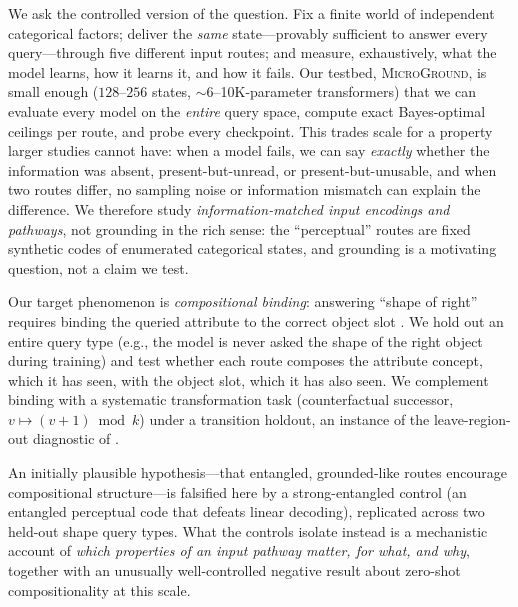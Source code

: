 \documentclass[10pt]{article} %
\newcommand{\microground}{\textsc{MicroGround}}
\begin{document}
We ask the controlled version of the question. Fix a finite world of independent categorical
factors; deliver the \emph{same} state---provably sufficient to answer every query---through five
different input routes; and measure, exhaustively, what the model learns, how it learns it, and how
it fails. Our testbed, \microground{}, is small enough ($128$--$256$ states, $\sim$6--10K-parameter
transformers) that we can evaluate every model on the \emph{entire} query space, compute exact
Bayes-optimal ceilings per route, and probe every checkpoint. This trades scale for a property
larger studies cannot have: when a model fails, we can say \emph{exactly} whether the information
was absent, present-but-unread, or present-but-unusable, and when two routes differ, no sampling
noise or information mismatch can explain the difference. We therefore study \emph{information-matched
input encodings and pathways}, not grounding in the rich sense: the ``perceptual'' routes are fixed
synthetic codes of enumerated categorical states, and grounding is a motivating question, not a
claim we test.

Our target phenomenon is \emph{compositional binding}: answering ``shape of right'' requires
binding the queried attribute to the correct object slot \citep{greff2020binding,feng2024how}. We
hold out an entire query type (e.g., the model is never asked the shape of the right object during
training) and test whether each route composes the attribute concept, which it has seen, with the
object slot, which it has also seen. We complement binding with a systematic transformation task
(counterfactual successor, $v \mapsto (v{+}1) \bmod k$) under a transition holdout, an instance of
the leave-region-out diagnostic of \citet{hu2024case}.

An initially plausible hypothesis---that entangled, grounded-like routes encourage compositional
structure---is falsified here by a strong-entangled control (an entangled perceptual code that
defeats linear decoding), replicated across two held-out shape query types. What the controls isolate
instead is a mechanistic account of \emph{which properties of an input pathway matter, for what, and
why}, together with an unusually well-controlled negative result about zero-shot
compositionality at this scale.
\end{document}
